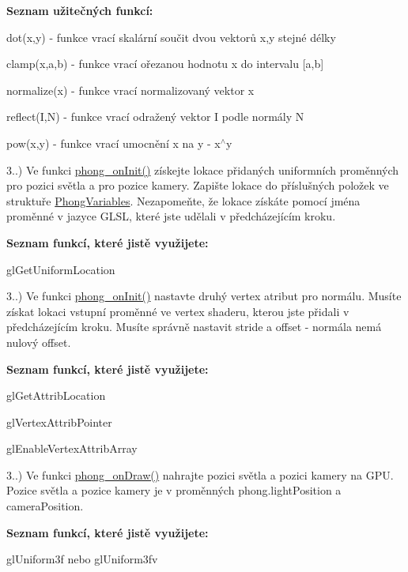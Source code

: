 \begin{DoxyRefList}
 {\bfseries Seznam užitečných funkcí\-:}
\begin{DoxyItemize}
\item dot(x,y) -\/ funkce vrací skalární součit dvou vektorů x,y stejné délky
\item clamp(x,a,b) -\/ funkce vrací ořezanou hodnotu x do intervalu \mbox{[}a,b\mbox{]}
\item normalize(x) -\/ funkce vrací normalizovaný vektor x
\item reflect(\-I,\-N) -\/ funkce vrací odražený vektor I podle normály N
\item pow(x,y) -\/ funkce vrací umocnění x na y -\/ x$^\wedge$y 
\end{DoxyItemize}

3..) Ve funkci \hyperlink{student_8h_ac2adb2ba4e748239b9db4d037584d3cc}{phong\-\_\-on\-Init()} získejte lokace přidaných uniformních proměnných pro pozici světla a pro pozice kamery. Zapište lokace do příslušných položek ve struktuře \hyperlink{structPhongVariables}{Phong\-Variables}. Nezapomeňte, že lokace získáte pomocí jména proměnné v jazyce G\-L\-S\-L, které jste udělali v předcházejícím kroku.\par
 {\bfseries Seznam funkcí, které jistě využijete\-:}
\begin{DoxyItemize}
\item gl\-Get\-Uniform\-Location 
\end{DoxyItemize}

3..) Ve funkci \hyperlink{student_8h_ac2adb2ba4e748239b9db4d037584d3cc}{phong\-\_\-on\-Init()} nastavte druhý vertex atribut pro normálu. Musíte získat lokaci vstupní proměnné ve vertex shaderu, kterou jste přidali v předcházejícím kroku. Musíte správně nastavit stride a offset -\/ normála nemá nulový offset.\par
 {\bfseries Seznam funkcí, které jistě využijete\-:}
\begin{DoxyItemize}
\item gl\-Get\-Attrib\-Location
\item gl\-Vertex\-Attrib\-Pointer
\item gl\-Enable\-Vertex\-Attrib\-Array 
\end{DoxyItemize}

3..) Ve funkci \hyperlink{student_8h_a53ffbb1a271d285abdaf7a029192f47e}{phong\-\_\-on\-Draw()} nahrajte pozici světla a pozici kamery na G\-P\-U. Pozice světla a pozice kamery je v proměnných phong.\-light\-Position a camera\-Position.\par
 {\bfseries Seznam funkcí, které jistě využijete\-:}
\begin{DoxyItemize}
\item gl\-Uniform3f nebo gl\-Uniform3fv 
\end{DoxyItemize}
\end{DoxyRefList}